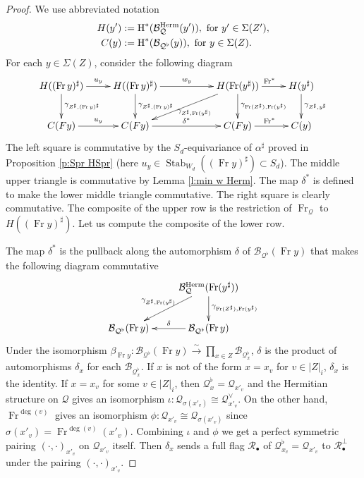 \documentclass[reqno]{amsart}
\numberwithin{equation}{section}
\DeclareMathOperator{\Frob}{Fr}
\DeclareMathOperator{\Fr}{Fr}
\DeclareMathOperator{\Stab}{Stab}
\DeclareMathOperator{\Herm}{Herm}
\newcommand\Sig{\Sigma}
\newcommand{\isom}{\stackrel{\sim}{\to}}
\newcommand{\bu}{\bullet}
\newcommand{\cohog}[2]{\textup{H}^{#1}({#2})}     %
\renewcommand\a\alpha
\renewcommand\b\beta
\newcommand\g\gamma
\renewcommand\d\delta
\newcommand{\io}{\iota}
\newcommand{\s}{\sigma}
\newcommand\sh{\sharp}
\newcommand\cB{\mathcal{B}}
\newcommand\cQ{\mathcal{Q}}
\newcommand\cR{\mathcal{R}}
\theoremstyle{remark}
\numberwithin{equation}{section}
\begin{document}
\begin{proof}
We use abbreviated notation
\begin{align*}
H(y') &:=\cohog{*}{\cB^{\Herm}_{\cQ}(y')}, \mbox{ for $y'\in\Sig(Z')$},\\
C(y) &:=\cohog{*}{\cB_{\cQ^{\flat}}(y)}, \mbox{ for $y\in\Sig(Z)$}.
\end{align*}
For each $y\in \Sig(Z)$, consider the following diagram
\begin{equation}\label{HC}
\xymatrix{H((\Fr y)^{\sh})\ar[r]^{u_{y}}\ar[d]^{\g_{Z^{\sh}, (\Fr y)^{\sh}}} & H((\Fr y)^{\sh})\ar[rr]^-{w_{y}}\ar[d]^{\g_{Z^{\sh}, (\Fr y)^{\sh}}} & & H(\Fr (y^{\sh})) \ar[dll]^{\g_{Z^{\sh}, \Fr (y^{\sh})}}\ar[r]^{\Fr ^{*}}\ar[d]^{\g_{\Fr (Z^{\sh}), \Fr (y^{\sh})}} & H(y^{\sh})\ar[d]^{\g_{Z^{\sh}, y^{\sh}}}\\
C(Fy)\ar[r]^{u_{y}} & C(Fy)\ar[rr]^{\d^{*}} && C(Fy)\ar[r]^{\Fr^{*}} & C(y)}
\end{equation}
The left square is commutative by the $S_{d}$-equivariance of $\a^{\sh}$ proved in Proposition \ref{p:Spr HSpr} (here $u_{y}\in \Stab_{W_{d}}((\Fr y)^{\sh})\subset S_{d}$). The middle upper triangle is commutative by Lemma \ref{l:min w Herm}. The map $\d^{*}$ is defined to make the lower middle triangle commutative. The right square is clearly commutative.  The composite of the upper row is the restriction of $\Frob_{\cQ}$ to $H((\Fr y)^{\sh})$. Let us compute the composite of the lower row. 

The map $\d^{*}$ is the pullback along the automorphism $\d$ of $\cB_{\cQ^{\flat}}(\Fr y)$ that makes the following diagram commutative
\begin{equation*}
\xymatrix{& \cB^{\Herm}_{\cQ}(\Fr (y^{\sh})) \ar[d]^{\g_{\Fr(Z^{\sh}), \Fr(y^{\sh})}}\ar[dl]_{\g_{Z^{\sh}, \Fr(y^{\sh})}}\\
\cB_{\cQ^{\flat}}(\Fr y) & \cB_{\cQ^{\flat}}(\Fr y) \ar[l]_{\d}}
\end{equation*}
Under the isomorphism $\b_{\Fr y}:\cB_{\cQ^{\flat}}(\Fr y)\isom \prod_{x\in Z}\cB_{\cQ^{\flat}_{x}}$, $\d$ is the product of automorphisms $\d_{x}$ for each $\cB_{\cQ^{\flat}_{x}}$. If $x$ is not of the form $x=x_{v}$ for $v\in |Z|_{i}$, 
$\d_{x}$ is the identity. If $x=x_{v}$ for some $v\in |Z|_{i}$, then $\cQ^{\flat}_{x}=\cQ_{x'_{v}}$ and the Hermitian structure on $\cQ$ gives an isomorphism $\io: \cQ_{\s(x'_{v})}\cong\cQ_{x'_{v}}^{\vee}$. On the other hand, $\Fr^{\deg(v)}$ gives an isomorphism $\phi: \cQ_{x'_{v}}\cong \cQ_{\s(x'_{v})}$ since $\s(x'_{v})=\Fr^{\deg(v)}(x'_{v})$.  Combining $\io$ and $\phi$ we get a perfect symmetric pairing $(\cdot,\cdot)_{x'_{v}}$ on $\cQ_{x'_{v}}$ itself. Then $\d_{x}$ sends a full flag $\cR_{\bu}$ of $\cQ^{\flat}_{x_{v}}=\cQ_{x'_{v}}$ to $\cR^{\bot}_{\bu}$ under the pairing $(\cdot,\cdot)_{x'_{v}}$.


\end{proof}
\end{document}
